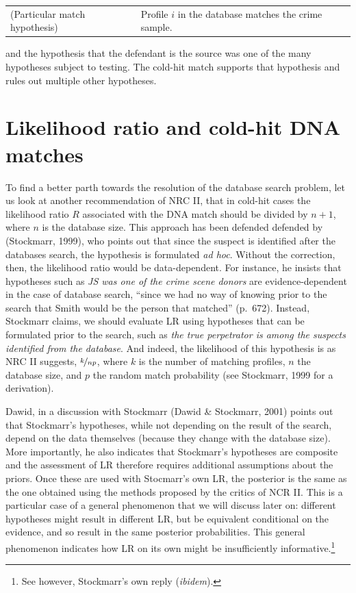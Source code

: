 \documentclass[10pt,dvipsnames,enabledeprecatedfontcommands]{scrartcl}
\begin{document}
\begin{tabular}{lp{8cm}}
(Particular match hypothesis) &
Profile $i$ in the database matches the crime sample.
\end{tabular}
\vspace{1mm}

\noindent and the hypothesis that the defendant is the source was one of
the many hypotheses subject to testing. The cold-hit match supports that
hypothesis and rules out multiple other hypotheses.

\hypertarget{likelihood-ratio-and-cold-hit-dna-matches}{%
\section{\texorpdfstring{Likelihood ratio and cold-hit DNA matches
\label{subsec:cold-hit}}{Likelihood ratio and cold-hit DNA matches }}\label{likelihood-ratio-and-cold-hit-dna-matches}}

To find a better parth towards the resolution of the database search
problem, let us look at another recommendation of NRC II, that in
cold-hit cases the likelihood ratio \(R\) associated with the DNA match
should be divided by \(n+1\), where \(n\) is the database size. This
approach has been defended defended by (Stockmarr, 1999), who points out
that since the suspect is identified after the databases search, the
hypothesis is formulated \textit{ad hoc}. Without the correction, then,
the likelihood ratio would be data-dependent. For instance, he insists
that hypotheses such as \emph{JS was one of the crime scene donors} are
evidence-dependent in the case of database search, ``since we had no way
of knowing prior to the search that Smith would be the person that
matched'' (p.~672). Instead, Stockmarr claims, we should evaluate LR
using hypotheses that can be formulated prior to the search, such as
\emph{the true perpetrator is among the suspects identified from the database}.
And indeed, the likelihood of this hypothesis is as NRC II suggests,
\(\nicefrac{k}{np}\), where \(k\) is the number of matching profiles,
\(n\) the database size, and \(p\) the random match probability (see
Stockmarr, 1999 for a derivation).

Dawid, in a discussion with Stockmarr (Dawid \& Stockmarr, 2001) points
out that Stockmarr's hypotheses, while not depending on the result of
the search, depend on the data themselves (because they change with the
database size). More importantly, he also indicates that Stockmarr's
hypotheses are composite and the assessment of LR therefore requires
additional assumptions about the priors. Once these are used with
Stocmarr's own LR, the posterior is the same as the one obtained using
the methods proposed by the critics of NCR II. This is a particular case
of a general phenomenon that we will discuss later on: different
hypotheses might result in different LR, but be equivalent conditional
on the evidence, and so result in the same posterior probabilities. This
general phenomenon indicates how LR on its own might be insufficiently
informative.\footnote{See however, Stockmarr's own reply
  (\emph{ibidem}).}
\end{document}
